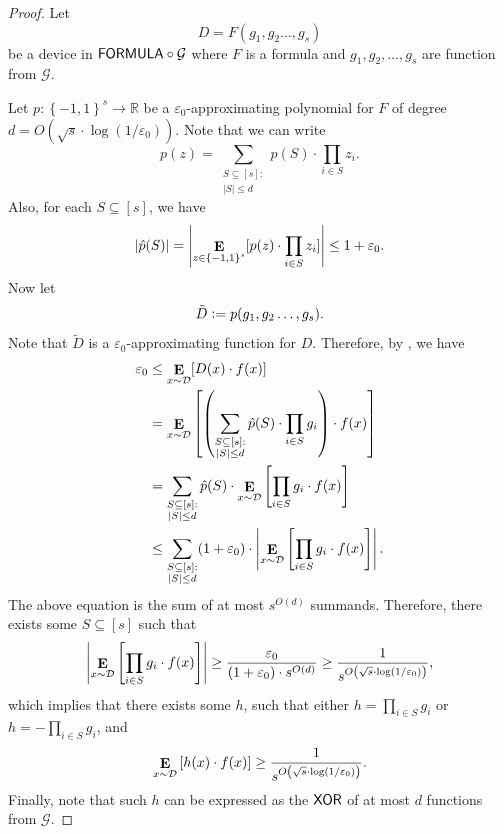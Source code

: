 \documentclass[10pt,a4paper]{article}
\DeclareMathOperator*\Exp{{\bf E}}
\newcommand{\boolpm}{\left\{-1,1\right\}}
\newcommand{\FORMULA}{{\sf FORMULA}}
\newcommand{\XOR}{{\sf XOR}}
\newcommand{\real}{\mathbb{R}}
\begin{document}
    \begin{proof}
		Let 
		\[
			D = F(g_1,g_2\dots,g_s)
		\]
		be a device in $\FORMULA\circ\mathcal{G}$ where $F$ is a formula and $g_1,g_2,\dots,g_s$ are function from $\mathcal{G}$.

		Let $p\colon\boolpm^s\to\real$ be a $\varepsilon_0$-approximating polynomial for $F$ of degree $d=O(\sqrt{s}\cdot\log(1/\varepsilon_0))$. Note that we can write
		\[
			p(z)=\sum_{\substack{S\subseteq[s]: \\ |S|\leq d}}\hat{p}(S)\cdot\prod_{i\in S}z_i.
		\]
		Also, for each $S\subseteq[s]$, we have
		\[
			|\hat{p}(S)|=\left| \Exp_{z\in\boolpm^s}[p(z)\cdot\prod_{i\in S}z_i] \right| \leq  1+\varepsilon_0.
		\]
		Now let
		\[
			\tilde{D} \vcentcolon= p(g_1,g_2\dots,g_s).
		\]
		Note that $\tilde{D}$ is a $\varepsilon_0$-approximating function for $D$. Therefore, by , we have
		\begin{align*}
			\varepsilon_0 &\leq \Exp_{x\sim\mathcal{D}}[D(x)\cdot f(x)]\\
			&= \Exp_{x\sim\mathcal{D}}\left[\left(\sum_{\substack{S\subseteq[s]: \\ |S|\leq d}}\hat{p}(S)\cdot\prod_{i\in S}g_i \right) \cdot f(x)\right]\\
			&=\sum_{\substack{S\subseteq[s]: \\ |S|\leq d}}\hat{p}(S)\cdot \Exp_{x\sim\mathcal{D}}\left[\prod_{i\in S}g_i\cdot f(x)\right]\\
			&\leq \sum_{\substack{S\subseteq[s]: \\ |S|\leq d}} (1+\varepsilon_0) \cdot \left| \Exp_{x\sim\mathcal{D}}\left[\prod_{i\in S}g_i\cdot f(x)\right] \right|.
		\end{align*}
		The above equation is the sum of at most $s^{O(d)}$ summands. Therefore, there exists some $S\subseteq[s]$ such that
		\[
			\left|\Exp_{x\sim\mathcal{D}}\left[\prod_{i\in S}g_i\cdot f(x)\right]\right| \geq \frac{\varepsilon_0}{(1+\varepsilon_0)\cdot s^{O(d)}}\geq \frac{1}{s^{O\left(\sqrt{s}\cdot\log(1/\varepsilon_0)\right)}},
		\]
		which implies that there exists some $h$, such that either $h=\prod_{i\in S}g_i$ or $h=-\prod_{i\in S}g_i$, and
		\[
			\Exp_{x\sim\mathcal{D}}\left[h(x)\cdot f(x)\right] \geq \frac{1}{s^{O\left(\sqrt{s}\cdot\log(1/\varepsilon_0)\right)}}.
		\]
		Finally, note that such $h$ can be expressed as the $\XOR$ of at most $d$ functions from $\mathcal{G}$.
    \end{proof}
    
\end{document}
